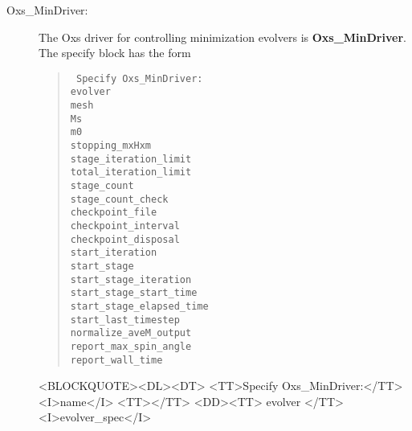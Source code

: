 \begin{description}
\item[Oxs\_MinDriver:\label{item:MinDriver}]
%
The Oxs driver for controlling minimization evolvers is
\textbf{Oxs\_MinDriver}.  The specify block has the form
\begin{latexonly}
\begin{quote}\tt
Specify Oxs\_MinDriver: \ocb\\
 \bi evolver \\
 \bi mesh \\
 \bi Ms \\
 \bi m0 \\
 \bi stopping\_mxHxm \\
 \bi stage\_iteration\_limit \\
 \bi total\_iteration\_limit \\
 \bi stage\_count \\
 \bi stage\_count\_check \\
 \bi checkpoint\_file \\
 \bi checkpoint\_interval \\
 \bi checkpoint\_disposal \\
 \bi start\_iteration \\
 \bi start\_stage \\
 \bi start\_stage\_iteration \\
 \bi start\_stage\_start\_time \\
 \bi start\_stage\_elapsed\_time \\
 \bi start\_last\_timestep \\
 \bi normalize\_aveM\_output \\
 \bi report\_max\_spin\_angle \\
 \bi report\_wall\_time \\
\ccb
\end{quote}
\end{latexonly}
\begin{rawhtml}
<BLOCKQUOTE><DL><DT>
<TT>Specify Oxs_MinDriver:</TT><I>name</I> <TT>{</TT>
<DD><TT> evolver </TT><I>evolver_spec</I>
}
\end{rawhtml}
\end{description}

